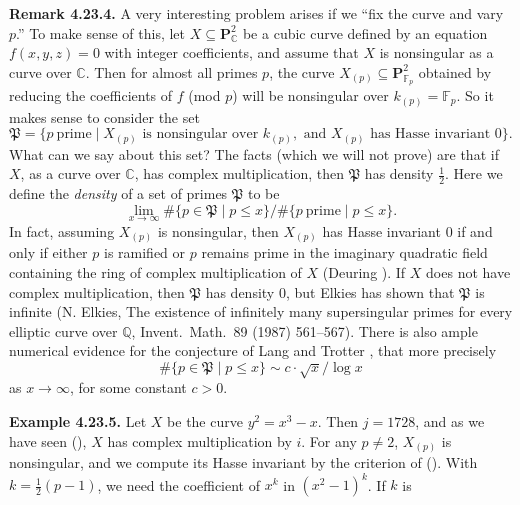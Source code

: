 {\medskip
\noindent\hypertarget{result-IV-4.23.4}{}\textbf{Remark 4.23.4.} A very interesting problem arises if we \textquotedblleft{}fix the curve and vary $p$.\textquotedblright{} To make sense of this, let $X\subseteq\mathbf P_{\mathbb C}^2$ be a cubic curve defined by an equation $f(x,y,z)=0$ with integer coefficients, and assume that $X$ is nonsingular as a curve over $\mathbb C$. Then for almost all primes $p$, the curve $X_{(p)}\subseteq\mathbf P_{\mathbb F_p}^2$ obtained by reducing the coefficients of $f$ (mod $p$) will be nonsingular over $k_{(p)}=\mathbb F_p$. So it makes sense to consider the set
{\small
\[
\mathfrak P=\{p\ \text{prime}\mid X_{(p)}\text{ is nonsingular over }k_{(p)},\text{ and }X_{(p)}\text{ has Hasse invariant }0\}.
\]}
What can we say about this set? The facts (which we will not prove) are that if $X$, as a curve over $\mathbb C$, has complex multiplication, then $\mathfrak P$ has density $\frac12$. Here we define the \emph{density} of a set of primes $\mathfrak P$ to be
\[
\lim_{x\to\infty}\#\{p\in\mathfrak P\mid p\le x\}/\#\{p\ \text{prime}\mid p\le x\}.
\]
In fact, assuming $X_{(p)}$ is nonsingular, then $X_{(p)}$ has Hasse invariant $0$ if and only if either $p$ is ramified or $p$ remains prime in the imaginary quadratic field containing the ring of complex multiplication of $X$ (Deuring ). If $X$ does not have complex multiplication, then $\mathfrak P$ has density $0$, but Elkies has shown that $\mathfrak P$ is infinite (N. Elkies, The existence of infinitely many supersingular primes for every elliptic curve over $\mathbb Q$, Invent.\ Math.\ 89 (1987) 561--567). There is also ample numerical evidence for the conjecture of Lang and Trotter , that more precisely
\[
\#\{p\in\mathfrak P\mid p\le x\}\sim c\cdot\sqrt{x}/\log x
\]
as $x\to\infty$, for some constant $c>0$.

\medskip
\noindent\hypertarget{result-IV-4.23.5}{}\textbf{Example 4.23.5.} Let $X$ be the curve $y^2=x^3-x$. Then $j=1728$, and as we have seen (), $X$ has complex multiplication by $i$. For any $p\ne2$, $X_{(p)}$ is nonsingular, and we compute its Hasse invariant by the criterion of (). With $k=\frac12(p-1)$, we need the coefficient of $x^k$ in $(x^2-1)^k$. If $k$ is}
